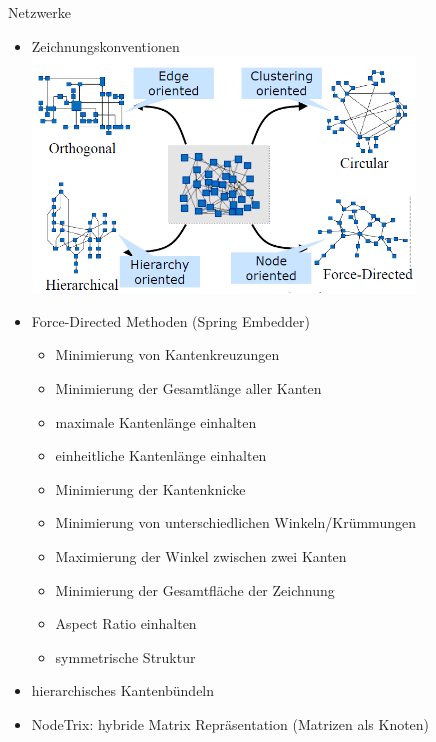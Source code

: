 \begin{TOP}{Netzwerke}
\vspace*{-1.5\baselineskip}
\begin{itemize}
	\item Zeichnungskonventionen\\
		\includegraphics[width=0.8\textwidth]{Pics/05-00-Konventionen.png}
	\item Force-Directed Methoden (Spring Embedder)
		\begin{itemize}
			\item Minimierung von Kantenkreuzungen
			\item Minimierung der Gesamtlänge aller Kanten
			\item maximale Kantenlänge einhalten
			\item einheitliche Kantenlänge einhalten
			\item Minimierung der Kantenknicke
			\item Minimierung von unterschiedlichen Winkeln/Krümmungen
			\item Maximierung der Winkel zwischen zwei Kanten
			\item Minimierung der Gesamtfläche der Zeichnung
			\item Aspect Ratio einhalten
			\item symmetrische Struktur
		\end{itemize}
	\item hierarchisches Kantenbündeln
	\item NodeTrix: hybride Matrix Repräsentation (Matrizen als Knoten)
\end{itemize}
\ \\
\end{TOP}